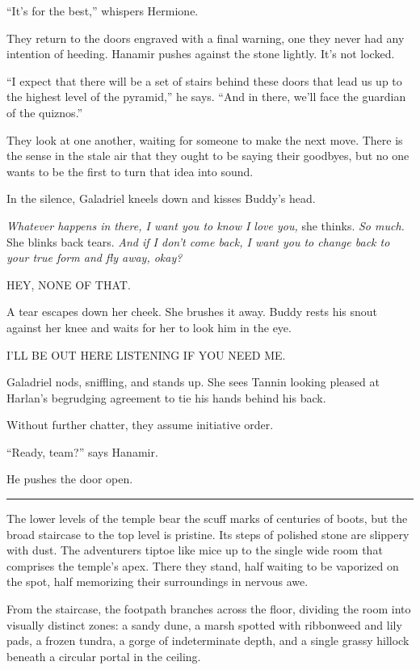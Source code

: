 \documentclass[smalldemyvopaper,11pt,twoside,onecolumn,openright,extrafontsizes]{memoir}
\begin{document}
``It's for the best,'' whispers Hermione.

They return to the doors engraved with a final warning, one they never
had any intention of heeding. Hanamir pushes against the stone lightly.
It's not locked.

``I expect that there will be a set of stairs behind these doors that
lead us up to the highest level of the pyramid,'' he says. ``And in
there, we'll face the guardian of the quiznos.''

They look at one another, waiting for someone to make the next move.
There is the sense in the stale air that they ought to be saying their
goodbyes, but no one wants to be the first to turn that idea into sound.

In the silence, Galadriel kneels down and kisses Buddy's head.

\emph{Whatever happens in there, I want you to know I love you,} she
thinks. \emph{So much.} She blinks back tears. \emph{And if I don't come
back, I want you to change back to your true form and fly away, okay?}

HEY, NONE OF THAT.

A tear escapes down her cheek. She brushes it away. Buddy rests his
snout against her knee and waits for her to look him in the eye.

I'LL BE OUT HERE LISTENING IF YOU NEED ME.

Galadriel nods, sniffling, and stands up. She sees Tannin looking
pleased at Harlan's begrudging agreement to tie his hands behind his
back.

Without further chatter, they assume initiative order.

``Ready, team?'' says Hanamir.

He pushes the door open.

\begin{center}\rule{0.5\linewidth}{\linethickness}\end{center}

The lower levels of the temple bear the scuff marks of centuries of
boots, but the broad staircase to the top level is pristine. Its steps
of polished stone are slippery with dust. The adventurers tiptoe like
mice up to the single wide room that comprises the temple's apex. There
they stand, half waiting to be vaporized on the spot, half memorizing
their surroundings in nervous awe.

From the staircase, the footpath branches across the floor, dividing the
room into visually distinct zones: a sandy dune, a marsh spotted with
ribbonweed and lily pads, a frozen tundra, a gorge of indeterminate
depth, and a single grassy hillock beneath a circular portal in the
ceiling.
\end{document}
